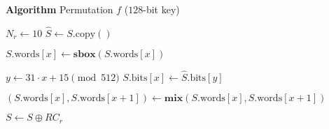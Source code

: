 \begin{algorithm}
\caption*{\textbf{Algorithm} Permutation $f$ ($128$-bit key)}
\label{alg:Algorithm}
\begin{algorithmic}
\State $N_r \gets 10$
\State $\hat{S} \gets S.\mathrm{copy}()$

    \State $S.\mathrm{words}[x] \gets \mathbf{sbox}(S.\mathrm{words}[x])$
  \EndFor

    \State $y \gets 31 \cdot x + 15 \pmod{512}$ 
    \State $S.\mathrm{bits}[x] \gets \hat{S}.\mathrm{bits}[y]$
  \EndFor

    \State $(S.\mathrm{words}[x], S.\mathrm{words}[x+1])
      \gets \mathbf{mix}(S.\mathrm{words}[x],S.\mathrm{words}[x+1])$
  \EndFor

  \State $S \gets S \oplus RC_r$
\EndFor
\end{algorithmic}
\end{algorithm}

